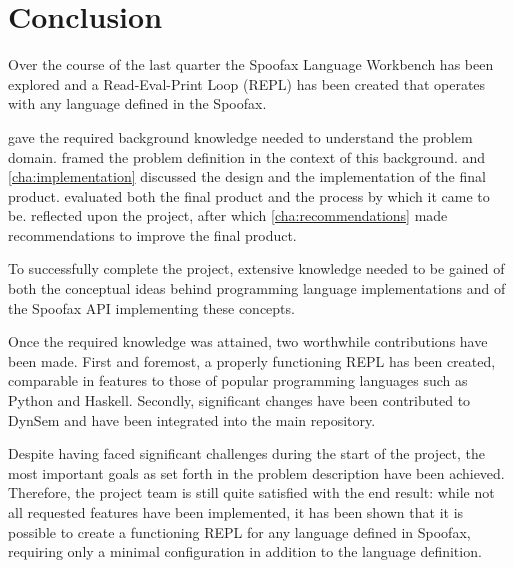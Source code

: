 \chapter{Conclusion}
\label{cha:conclusion}

Over the course of the last quarter the Spoofax Language Workbench has been
explored and a Read-Eval-Print Loop (REPL) has been created that operates with
any language defined in the Spoofax.

 gave the required background knowledge needed to
understand the problem domain.  framed the problem
definition in the context of this background.  and
\cref{cha:implementation} discussed the design and the implementation of the
final product.  evaluated both the final product and the
process by which it came to be.  reflected upon the
project, after which \cref{cha:recommendations} made recommendations to improve
the final product.

To successfully complete the project, extensive knowledge needed to be gained of
both the conceptual ideas behind programming language implementations and of the
Spoofax API implementing these concepts.

Once the required knowledge was attained, two worthwhile contributions have been
made. First and foremost, a properly functioning REPL has been created,
comparable in features to those of popular programming languages such as Python
and Haskell. Secondly, significant changes have been contributed to DynSem and
have been integrated into the main repository.

Despite having faced significant challenges during the start of the project, the
most important goals as set forth in the problem description have been achieved.
Therefore, the project team is still quite satisfied with the end result: while
not all requested features have been implemented, it has been shown that it is
possible to create a functioning REPL for any language defined in Spoofax,
requiring only a minimal configuration in addition to the language definition.


